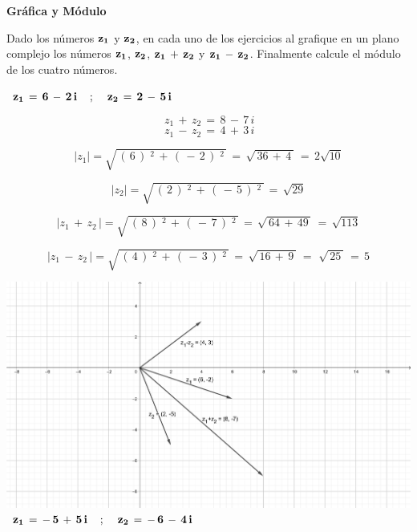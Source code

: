 \documentclass[a4paper,11pt,openany]{book}
\begin{document}
\newpage


\begin{center}
\textbf{Gráfica y Módulo}
\end{center}

Dado los números $\bf{z_{1}}$ y $\bf{z_{2}}$, en cada uno de los ejercicios  al  grafique en un plano complejo los números $\bf{z_{1}}$, $\bf{z_{2}}$, $\bf{z_{1}\,+\,z_{2}}$ y $\bf{z_{1}\,-\,z_{2}}$. Finalmente calcule el módulo de los cuatro números.\\

\providecommand{\abs}[1]{\lvert#1\rvert} 
\graphicspath{ {images/} }

\textcolor{ao(english)}{}\,\quad\,$\bf{z_{1}\,=\,6\,-\,2\,i \quad\,;\,\quad z_{2}\,=\,2\,-\,5\,i}$

$$\,{z_1}\,+\,{z_2}\,=\,8\,-\,7\,i$$
$$\,{z_1}\,-\,{z_2}\,=\,4\,+\,3\,i$$

$$\abs{z_1} = \sqrt{\,(\,6\,)\,^{\,2}\,+\,(\,-\,2\,)\,^{\,2}\,}\,=\,\sqrt{\,36\,+\,4\,}\,=\,\boxed{2\sqrt{10}}$$

$$\abs{z_2} = \sqrt{\,(\,2\,)\,^{\,2}\,+\,(\,-\,5\,)\,^{\,2}\,}\,=\,\boxed{\sqrt{29}}$$

$$\abs{z_1\,+\,{z_2}\,} = \sqrt{\,(\,8\,)\,^{\,2}\,+\,(\,-\,7\,)\,^{\,2}\,}\,=\,\sqrt{\,64\,+\,49\,}\,=\,\boxed{\sqrt{113}}$$

$$\abs{z_1\,-\,{z_2}\,} = \sqrt{\,(\,4\,)\,^{\,2}\,+\,(\,-\,3\,)\,^{\,2}\,}\,=\,\sqrt{\,16\,+\,9\,}\,=\,\,\sqrt{\,25\,}\,=\,\boxed{5}$$

\includegraphics[width=15cm]{geo1}
\\

\textcolor{ao(english)}{}\,\quad\,$\bf{z_{1}\,=\,-\,5\,+\,5\,i \quad\,;\,\quad z_{2}\,=\,-\,6\,-\,4\,i}$
\end{document}

